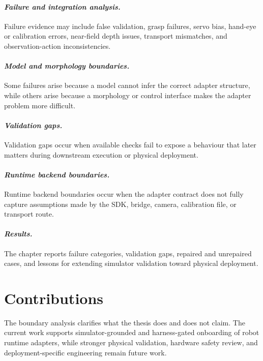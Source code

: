 \paragraph{\textit{Failure and integration analysis.}}
Failure evidence may include false validation, grasp failures, servo bias,
hand-eye or calibration errors, near-field depth issues, transport mismatches,
and observation-action inconsistencies.

\paragraph{\textit{Model and morphology boundaries.}}
Some failures arise because a model cannot infer the correct adapter structure,
while others arise because a morphology or control interface makes the adapter
problem more difficult.

\paragraph{\textit{Validation gaps.}}
Validation gaps occur when available checks fail to expose a behaviour that
later matters during downstream execution or physical deployment.

\paragraph{\textit{Runtime backend boundaries.}}
Runtime backend boundaries occur when the adapter contract does not fully
capture assumptions made by the SDK, bridge, camera, calibration file, or
transport route.

\paragraph{\textit{Results.}}
The chapter reports failure categories, validation gaps, repaired and
unrepaired cases, and lessons for extending simulator validation toward
physical deployment.

\section[Contributions]{Contributions}
The boundary analysis clarifies what the thesis does and does not claim. The
current work supports simulator-grounded and harness-gated onboarding of robot
runtime adapters, while stronger physical validation, hardware safety review,
and deployment-specific engineering remain future work.

